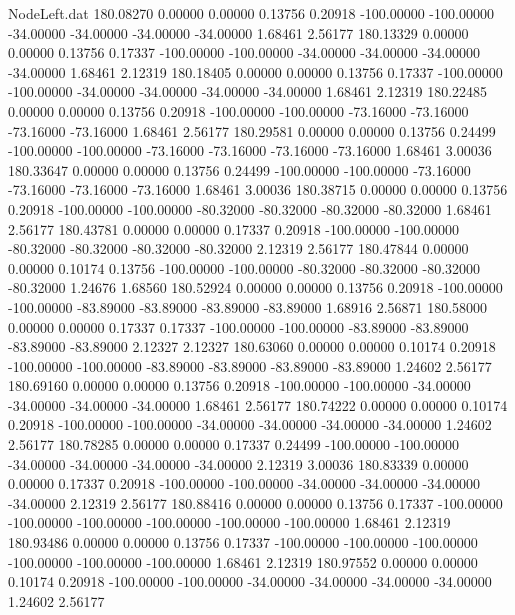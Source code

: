\begin{filecontents}{NodeLeft.dat}
 180.08270    0.00000    0.00000     0.13756    0.20918 -100.00000 -100.00000  -34.00000  -34.00000  -34.00000  -34.00000    1.68461    2.56177
 180.13329    0.00000    0.00000     0.13756    0.17337 -100.00000 -100.00000  -34.00000  -34.00000  -34.00000  -34.00000    1.68461    2.12319
 180.18405    0.00000    0.00000     0.13756    0.17337 -100.00000 -100.00000  -34.00000  -34.00000  -34.00000  -34.00000    1.68461    2.12319
 180.22485    0.00000    0.00000     0.13756    0.20918 -100.00000 -100.00000  -73.16000  -73.16000  -73.16000  -73.16000    1.68461    2.56177
 180.29581    0.00000    0.00000     0.13756    0.24499 -100.00000 -100.00000  -73.16000  -73.16000  -73.16000  -73.16000    1.68461    3.00036
 180.33647    0.00000    0.00000     0.13756    0.24499 -100.00000 -100.00000  -73.16000  -73.16000  -73.16000  -73.16000    1.68461    3.00036
 180.38715    0.00000    0.00000     0.13756    0.20918 -100.00000 -100.00000  -80.32000  -80.32000  -80.32000  -80.32000    1.68461    2.56177
 180.43781    0.00000    0.00000     0.17337    0.20918 -100.00000 -100.00000  -80.32000  -80.32000  -80.32000  -80.32000    2.12319    2.56177
 180.47844    0.00000    0.00000     0.10174    0.13756 -100.00000 -100.00000  -80.32000  -80.32000  -80.32000  -80.32000    1.24676    1.68560
 180.52924    0.00000    0.00000     0.13756    0.20918 -100.00000 -100.00000  -83.89000  -83.89000  -83.89000  -83.89000    1.68916    2.56871
 180.58000    0.00000    0.00000     0.17337    0.17337 -100.00000 -100.00000  -83.89000  -83.89000  -83.89000  -83.89000    2.12327    2.12327
 180.63060    0.00000    0.00000     0.10174    0.20918 -100.00000 -100.00000  -83.89000  -83.89000  -83.89000  -83.89000    1.24602    2.56177
 180.69160    0.00000    0.00000     0.13756    0.20918 -100.00000 -100.00000  -34.00000  -34.00000  -34.00000  -34.00000    1.68461    2.56177
 180.74222    0.00000    0.00000     0.10174    0.20918 -100.00000 -100.00000  -34.00000  -34.00000  -34.00000  -34.00000    1.24602    2.56177
 180.78285    0.00000    0.00000     0.17337    0.24499 -100.00000 -100.00000  -34.00000  -34.00000  -34.00000  -34.00000    2.12319    3.00036
 180.83339    0.00000    0.00000     0.17337    0.20918 -100.00000 -100.00000  -34.00000  -34.00000  -34.00000  -34.00000    2.12319    2.56177
 180.88416    0.00000    0.00000     0.13756    0.17337 -100.00000 -100.00000 -100.00000 -100.00000 -100.00000 -100.00000    1.68461    2.12319
 180.93486    0.00000    0.00000     0.13756    0.17337 -100.00000 -100.00000 -100.00000 -100.00000 -100.00000 -100.00000    1.68461    2.12319
 180.97552    0.00000    0.00000     0.10174    0.20918 -100.00000 -100.00000  -34.00000  -34.00000  -34.00000  -34.00000    1.24602    2.56177

\end{filecontents}
